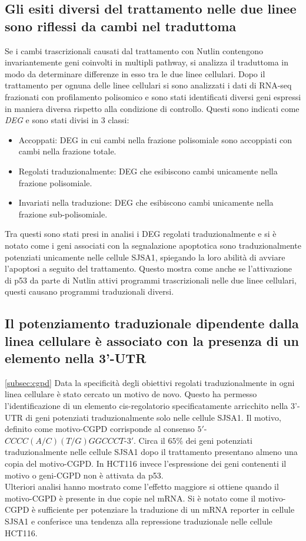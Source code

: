   \subsection{Gli esiti diversi del trattamento nelle due linee sono riflessi da cambi nel traduttoma}
  Se i cambi trascrizionali causati dal trattamento con Nutlin contengono invariantemente geni coinvolti in multipli pathway, si analizza il traduttoma in modo da determinare differenze in esso tra le due linee cellulari.
  Dopo il trattamento per ognuna delle linee cellulari si sono analizzati i dati di RNA-seq frazionati con profilamento polisomico e sono stati identificati diversi geni espressi in maniera diversa rispetto alla condizione di controllo.
  Questi sono indicati come \emph{DEG} e sono stati divisi in $3$ classi:
  \begin{itemize}
    \item Accoppati: DEG in cui cambi nella frazione polisomiale sono accoppiati con cambi nella frazione totale.
    \item Regolati traduzionalmente: DEG che esibiscono cambi unicamente nella frazione polisomiale.
    \item Invariati nella traduzione: DEG che esibiscono cambi unicamente nella frazione sub-polisomiale.
  \end{itemize}
  Tra questi sono stati presi in analisi i DEG regolati traduzionalmente e si \`e notato come i geni associati con la segnalazione apoptotica sono traduzionalmente potenziati unicamente nelle cellule SJSA1, spiegando la loro abilit\`a di avviare l'apoptosi a seguito del trattamento.
  Questo mostra come anche se l'attivazione di p53 da parte di Nutlin attivi programmi trascrizionali nelle due linee cellulari, questi causano programmi traduzionali diversi.

  \subsection{Il potenziamento traduzionale dipendente dalla linea cellulare \`e associato con la presenza di un elemento nella 3'-UTR}
  \ref{subsec:cgpd}
  Data la specificit\`a degli obiettivi regolati traduzionalmente in ogni linea cellulare \`e stato cercato un motivo de novo.
  Questo ha permesso l'identificazione di un elemento cis-regolatorio specificatamente arricchito nella 3'-UTR di geni potenziati traduzionalmente solo nelle cellule SJSA1.
  Il motivo, definito come motivo-CGPD corrisponde al consenso $5'$-$CCCC(A/C)(T/G)GGCCCT$-$3'$.
  Circa il $65\%$ dei geni potenziati traduzionalmente nelle cellule SJSA1 dopo il trattamento presentano almeno una copia del motivo-CGPD.
  In HCT116 invece l'espressione dei geni contenenti il motivo o geni-CGPD non \`e attivata da p53.\\
  Ulteriori analisi hanno mostrato come l'effetto maggiore si ottiene quando il motivo-CGPD \`e presente in due copie nel mRNA.
  Si \`e notato come il motivo-CGPD \`e sufficiente per potenziare la traduzione di un mRNA reporter in cellule SJSA1 e conferisce una tendenza alla repressione traduzionale nelle cellule HCT116.

